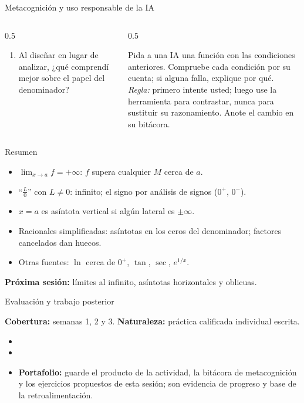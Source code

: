 \documentclass[10pt,aspectratio=169]{beamer}
\begin{document}
\begin{frame}{Metacognición y uso responsable de la IA}
  \small
  \begin{columns}[t]
    \begin{column}{0.5\textwidth}
      \begin{metacog}
        \begin{enumerate}
          \metacomun
          \item Al diseñar en lugar de analizar, ¿qué comprendí mejor sobre el papel del denominador?
        \end{enumerate}
      \end{metacog}
    \end{column}
    \begin{column}{0.5\textwidth}
      \begin{iabox}
        Pida a una IA una función con las condiciones anteriores. Compruebe cada condición por su cuenta; si alguna falla, explique por qué.\\[2pt]
        \textit{Regla:} primero intente usted; luego use la herramienta para contrastar, nunca para sustituir su razonamiento. Anote el cambio en su bitácora.
      \end{iabox}
    \end{column}
  \end{columns}
\end{frame}

\begin{frame}{Resumen}
  \begin{itemize}
    \item $\lim_{x\to a}f=+\infty$: $f$ supera cualquier $M$ cerca de $a$.
    \item ``$\frac{L}{0}$'' con $L\ne0$: infinito; el signo por análisis de signos ($0^+$, $0^-$).
    \item $x=a$ es asíntota vertical si algún lateral es $\pm\infty$.
    \item Racionales simplificadas: asíntotas en los ceros del denominador; factores cancelados dan huecos.
    \item Otras fuentes: $\ln$ cerca de $0^+$, $\tan$, $\sec$, $e^{1/x}$.
  \end{itemize}
  \vspace{3mm}
  \textbf{Próxima sesión:} límites al infinito, asíntotas horizontales y oblicuas.
\end{frame}


\begin{frame}{Evaluación y trabajo posterior}
  \small
  \begin{evalbox}
    \textbf{Cobertura:} semanas 1, 2 y 3. \textbf{Naturaleza:} práctica calificada individual escrita.
  \end{evalbox}
  \begin{itemize}
    \item \criterios
    \item \declaracionia
    \item \textbf{Portafolio:} guarde el producto de la actividad, la bitácora de metacognición y los ejercicios propuestos de esta sesión; son evidencia de progreso y base de la retroalimentación.
  \end{itemize}
\end{frame}
\end{document}

